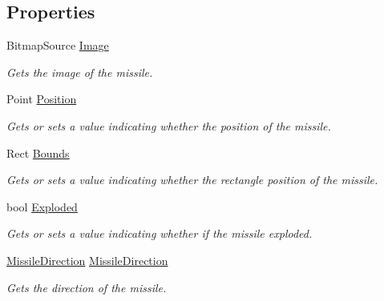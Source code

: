 \subsection*{Properties}
\begin{DoxyCompactItemize}
\item 
Bitmap\+Source \mbox{\hyperlink{class_o_e_invaders_1_1_library_1_1_missile_a79a920739cfa1423f490667dfbeaedd8}{Image}}
\begin{DoxyCompactList}\small\item\em Gets the image of the missile. \end{DoxyCompactList}\item 
Point \mbox{\hyperlink{class_o_e_invaders_1_1_library_1_1_missile_a064599651ab8720c3e4be406bb9e3484}{Position}}
\begin{DoxyCompactList}\small\item\em Gets or sets a value indicating whether the position of the missile. \end{DoxyCompactList}\item 
Rect \mbox{\hyperlink{class_o_e_invaders_1_1_library_1_1_missile_ab279292d3624bfd36b7c2475101b0896}{Bounds}}
\begin{DoxyCompactList}\small\item\em Gets or sets a value indicating whether the rectangle position of the missile. \end{DoxyCompactList}\item 
bool \mbox{\hyperlink{class_o_e_invaders_1_1_library_1_1_missile_adaba70cdbae983ee6c66451e195b94d3}{Exploded}}
\begin{DoxyCompactList}\small\item\em Gets or sets a value indicating whether if the missile exploded. \end{DoxyCompactList}\item 
\mbox{\hyperlink{namespace_o_e_invaders_1_1_library_abefe34068a8894fb3391a5f1e315edcd}{Missile\+Direction}} \mbox{\hyperlink{class_o_e_invaders_1_1_library_1_1_missile_a9ed22bd68e1049f6ca360e4e1b9c3306}{Missile\+Direction}}
\begin{DoxyCompactList}\small\item\em Gets the direction of the missile. \end{DoxyCompactList}\item 

\end{DoxyCompactItemize}
